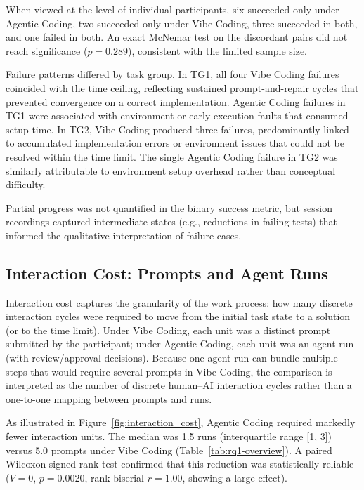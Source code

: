 When viewed at the level of individual participants, six succeeded only under Agentic Coding, two succeeded only under Vibe Coding, three succeeded in both, and one failed in both. An exact McNemar test on the discordant pairs did not reach significance ($p=0.289$), consistent with the limited sample size.

Failure patterns differed by task group. In TG1, all four Vibe Coding failures coincided with the time ceiling, reflecting sustained prompt-and-repair cycles that prevented convergence on a correct implementation. Agentic Coding failures in TG1 were associated with environment or early-execution faults that consumed setup time. In TG2, Vibe Coding produced three failures, predominantly linked to accumulated implementation errors or environment issues that could not be resolved within the time limit. The single Agentic Coding failure in TG2 was similarly attributable to environment setup overhead rather than conceptual difficulty.

Partial progress was not quantified in the binary success metric, but session recordings captured intermediate states (e.g., reductions in failing tests) that informed the qualitative interpretation of failure cases.

\subsection{Interaction Cost: Prompts and Agent Runs}

Interaction cost captures the granularity of the work process: how many discrete interaction cycles were required to move from the initial task state to a solution (or to the time limit). Under Vibe Coding, each unit was a distinct prompt submitted by the participant; under Agentic Coding, each unit was an agent run (with review/approval decisions). Because one agent run can bundle multiple steps that would require several prompts in Vibe Coding, the comparison is interpreted as the number of discrete human--AI interaction cycles rather than a one-to-one mapping between prompts and runs.

As illustrated in Figure~\ref{fig:interaction_cost}, Agentic Coding required markedly fewer interaction units. The median was 1.5 runs (interquartile range [1, 3]) versus 5.0 prompts under Vibe Coding (Table~\ref{tab:rq1-overview}). A paired Wilcoxon signed-rank test confirmed that this reduction was statistically reliable ($V=0$, $p=0.0020$, rank-biserial $r=1.00$, showing a large effect).


